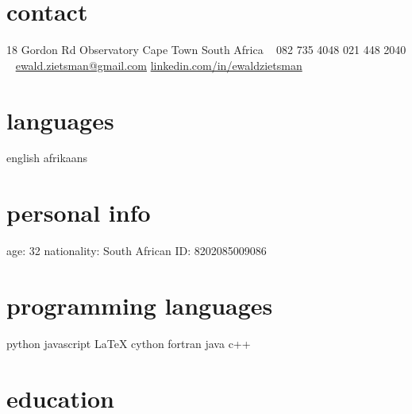 \documentclass[]{friggeri-cv} %
\begin{document}


\begin{aside} %
\section{contact}
18 Gordon Rd
Observatory
Cape Town
South Africa
~
082 735 4048
021 448 2040
~
\href{mailto:ewald.zietsman@gmail.com}{ewald.zietsman@gmail.com}
\href{http://za.linkedin.com/in/ewaldzietsman/}{linkedin.com/in/ewaldzietsman}
\section{languages}
english 
afrikaans
\section{personal info}
age: 32
nationality: South African
ID: 8202085009086
\section{programming languages}
python
javascript
\LaTeX
cython
fortran
java
c++
\end{aside}


\section{education}
\end{document}
